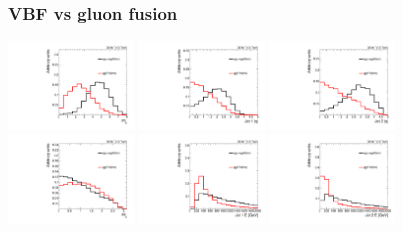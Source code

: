 \documentclass[aspectratio=169,xcolor=dvipsnames,,table,compress]{beamer}
\begin{document}
\begin{frame} \frametitle{VBF vs gluon fusion}
  \vspace{-5mm}
    \begin{center}
        \includegraphics[width=0.25\textwidth]{../figures/vbf/shapes_signal/loosesignal_jot12DEta.pdf}
        \includegraphics[width=0.25\textwidth]{../figures/vbf/shapes_signal/loosesignal_fabsjotEta_0_.pdf}
        \includegraphics[width=0.25\textwidth]{../figures/vbf/shapes_signal/loosesignal_fabsjotEta_1_.pdf} \\
        \includegraphics[width=0.25\textwidth]{../figures/vbf/shapes_signal/loosesignal_jot12DPhi.pdf}
        \includegraphics[width=0.25\textwidth]{../figures/vbf/shapes_signal/loosesignal_jotE_0_.pdf}
        \includegraphics[width=0.25\textwidth]{../figures/vbf/shapes_signal/loosesignal_jotE_1_.pdf} 
    \end{center}
\end{frame}
\end{document}
